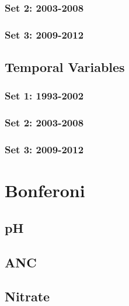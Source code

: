 		\subsection{Set 2: 2003-2008}
		 \pagebreak

		\subsection{Set 3: 2009-2012}
		 \pagebreak

	\section{Temporal Variables}\label{sec:TVJD}

		\subsection{Set 1: 1993-2002}
		 \pagebreak

		\subsection{Set 2: 2003-2008}
		 \pagebreak

		\subsection{Set 3: 2009-2012}
		 \pagebreak


\chapter{Bonferoni}\pagebreak
	\section{pH}\label{app:bon}
		
 
	\section{ANC}%
		

	\section{Nitrate}
		

